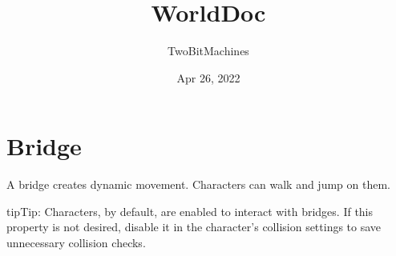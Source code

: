 \documentclass[letterpaper,11pt,english,openany,oneside]{sphinxmanual}
\title{WorldDoc}
\date{Apr 26, 2022}
\author{TwoBitMachines}
\begin{document}
\pagestyle{empty}
\sphinxmaketitle
\pagestyle{plain}
\sphinxtableofcontents
\pagestyle{normal}
\label{\detokenize{index::doc}}


\sphinxstepscope


\chapter{Bridge}
\label{\detokenize{interactables/bridge:bridge}}\label{\detokenize{interactables/bridge::doc}}
\sphinxAtStartPar
A bridge creates dynamic movement. Characters can walk and jump on them.


\begin{sphinxadmonition}{tip}{Tip:}
\sphinxAtStartPar
Characters, by default, are enabled to interact with bridges. If this property
is not desired, disable it in the character’s collision settings to save
unnecessary collision checks.
\end{sphinxadmonition}
\end{document}
